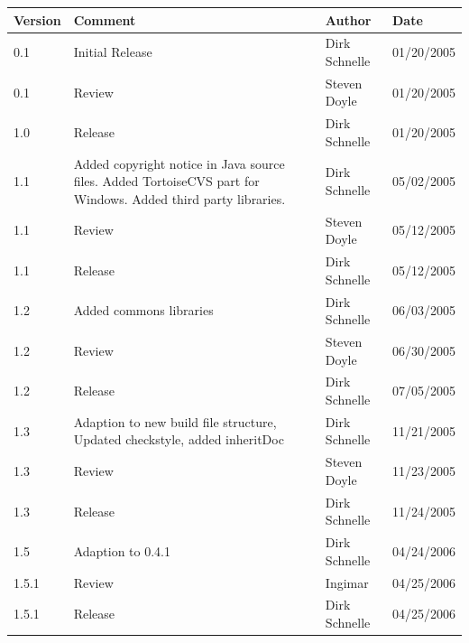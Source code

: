 \documentclass[11pt,a4paper]{article}
\begin{document}
\begin{tabular}{|l|p{5cm}|l|l|}
\hline
\textbf{Version} & \textbf{Comment} & \textbf{Author} & \textbf{Date} \\
\hline
\hline
0.1 & Initial Release & Dirk Schnelle & 01/20/2005 \\
\hline
0.1 & Review & Steven Doyle & 01/20/2005 \\
\hline
1.0 & Release & Dirk Schnelle & 01/20/2005 \\
\hline
1.1 & Added copyright notice in Java source files.
Added TortoiseCVS part for Windows.
Added third party libraries. & Dirk Schnelle & 
 05/02/2005 \\
\hline
1.1 & Review & Steven Doyle & 05/12/2005 \\
\hline
1.1 & Release & Dirk Schnelle & 05/12/2005 \\
\hline
1.2 & Added commons libraries & Dirk Schnelle & 06/03/2005 \\
\hline
1.2 & Review & Steven Doyle & 06/30/2005 \\
\hline
1.2 & Release & Dirk Schnelle & 07/05/2005 \\
\hline
1.3 & Adaption to new build file structure, Updated checkstyle, added 
inheritDoc & Dirk Schnelle & 11/21/2005 \\
\hline
1.3 & Review & Steven Doyle & 11/23/2005 \\
\hline
1.3 & Release & Dirk Schnelle & 11/24/2005 \\
\hline
1.5 & Adaption to 0.4.1  & Dirk Schnelle & 04/24/2006 \\
\hline
1.5.1 & Review & Ingimar  & 04/25/2006 \\
\hline
1.5.1 & Release  & Dirk Schnelle & 04/25/2006 \\
\hline
\end{tabular}




\end{document}
